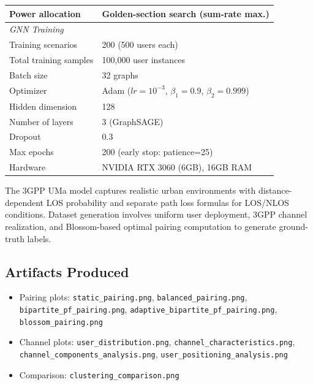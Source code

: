 \begin{table}[!t]
\begin{tabular}{l l}
Power allocation & Golden-section search (sum-rate max.) \\
\midrule
\multicolumn{2}{l}{\textit{GNN Training}} \\
Training scenarios & 200 (500 users each) \\
Total training samples & 100,000 user instances \\
Batch size & 32 graphs \\
Optimizer & Adam ($lr=10^{-3}$, $\beta_1=0.9$, $\beta_2=0.999$) \\
Hidden dimension & 128 \\
Number of layers & 3 (GraphSAGE) \\
Dropout & 0.3 \\
Max epochs & 200 (early stop: patience=25) \\
Hardware & NVIDIA RTX 3060 (6GB), 16GB RAM \\
\bottomrule
\end{tabular}
\end{table}

The 3GPP UMa model captures realistic urban environments with distance-dependent LOS probability and separate path loss formulas for LOS/NLOS conditions. Dataset generation involves uniform user deployment, 3GPP channel realization, and Blossom-based optimal pairing computation to generate ground-truth labels.

\subsection{Artifacts Produced}
\begin{itemize}
  \item Pairing plots: \texttt{static\_pairing.png}, \texttt{balanced\_pairing.png}, \texttt{bipartite\_pf\_pairing.png}, \texttt{adaptive\_bipartite\_pf\_pairing.png}, \texttt{blossom\_pairing.png}
  \item Channel plots: \texttt{user\_distribution.png}, \texttt{channel\_characteristics.png}, \texttt{channel\_components\_analysis.png}, \texttt{user\_positioning\_analysis.png}
  \item Comparison: \texttt{clustering\_comparison.png}
\end{itemize}
